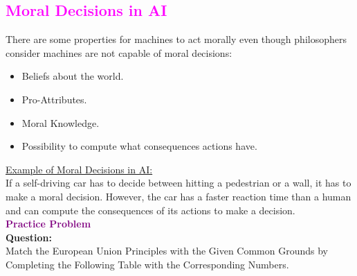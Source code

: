 \documentclass{book}
\begin{document}
\textcolor{magenta}{\section{\textbf{Moral Decisions in AI}}}
There are some properties for machines to act morally even though philosophers consider machines are not capable of moral decisions:
\begin{itemize}
    \item Beliefs about the world.
    \item Pro-Attributes.
    \item Moral Knowledge.
    \item Possibility to compute what consequences actions have.
\end{itemize}
\uline{Example of Moral Decisions in AI:}\\
If a self-driving car has to decide between hitting a pedestrian or a wall, it has to make a moral decision. However, the car has a faster reaction time than a human and can compute the consequences of its actions to make a decision.\\
\vfill
\textbf{\textcolor{purple}{\Large{Practice Problem}}}\\
\textbf{Question:}\\
Match the European Union Principles with the Given Common Grounds by Completing the Following Table with the Corresponding Numbers.\\
\end{document}
